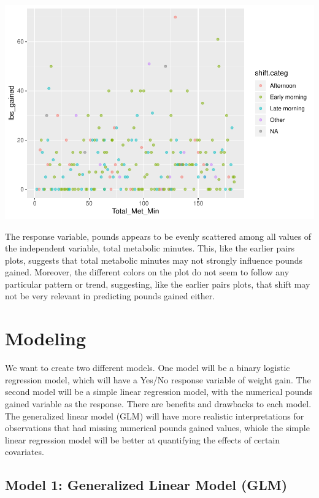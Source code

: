 \documentclass[]{article}
\begin{document}
\includegraphics{Practicum-1-Technical-Report_v2_files/figure-latex/unnamed-chunk-5-1.pdf}

The response variable, pounds appears to be evenly scattered among all
values of the independent variable, total metabolic minutes. This, like
the earlier pairs plots, suggests that total metabolic minutes may not
strongly influence pounds gained. Moreover, the different colors on the
plot do not seem to follow any particular pattern or trend, suggesting,
like the earlier pairs plots, that shift may not be very relevant in
predicting pounds gained either.

\hypertarget{modeling}{%
\section{Modeling}\label{modeling}}

We want to create two different models. One model will be a binary
logistic regression model, which will have a Yes/No response variable of
weight gain. The second model will be a simple linear regression model,
with the numerical pounds gained variable as the response. There are
benefits and drawbacks to each model. The generalized linear model (GLM)
will have more realistic interpretations for observations that had
missing numerical pounds gained values, whiole the simple linear
regression model will be better at quantifying the effects of certain
covariates.

\hypertarget{model-1-generalized-linear-model-glm}{%
\subsection{Model 1: Generalized Linear Model
(GLM)}\label{model-1-generalized-linear-model-glm}}
\end{document}
